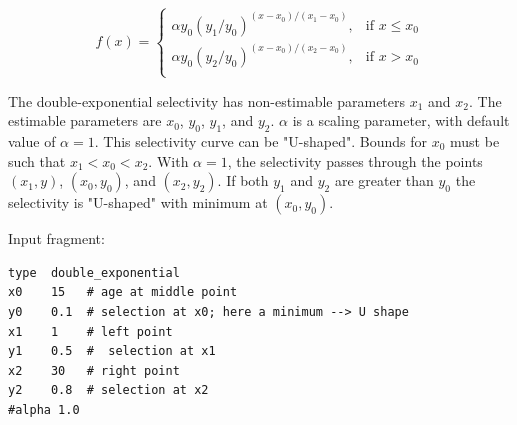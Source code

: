 \begin{equation}
f(x)=\begin{cases}
	  \alpha y_0(y_1 / y_0)^{(x-x_0)/(x_1-x_0)}, & \text{if $x \le x_0$} \\
	  \alpha y_0(y_2 / y_0)^{(x-x_0)/(x_2-x_0)}, & \text{if $x > x_0$} \\
  \end{cases}
\end{equation}

The double-exponential selectivity has non-estimable parameters $x_1$ and $x_2$. The estimable parameters are $x_0$, $y_0$, $y_1$, and $y_2$.  $\alpha$ is a scaling parameter, with default value of $\alpha = 1$. This selectivity curve can be "U-shaped". Bounds for $x_0$ must be such that $x_1 < x_0 < x_2$. With $\alpha=1$, the selectivity passes through the points $(x_1, y)$, $(x_0, y_0)$, and $(x_2, y_2)$. If both $y_1$ and $y_2$ are greater than $y_0$ the selectivity is "U-shaped" with minimum at $(x_0, y_0)$.

Input fragment: {\small{\begin{verbatim}
type  double_exponential
x0    15   # age at middle point
y0    0.1  # selection at x0; here a minimum --> U shape
x1    1    # left point
y1    0.5  #  selection at x1
x2    30   # right point
y2    0.8  # selection at x2
#alpha 1.0
\end{verbatim}}}

%
%

